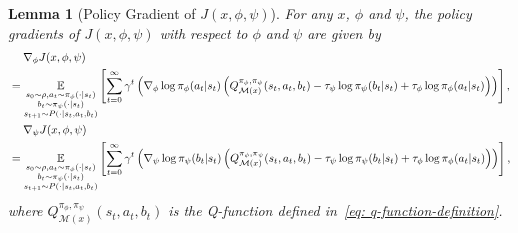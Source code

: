 \documentclass{article}
\theoremstyle{plain}
\newtheorem{lemma}{Lemma}
\theoremstyle{definition}
\theoremstyle{remark}
\def\E{\mathbb E}
\def\cM{\mathcal M}
\begin{document}
\begin{lemma}[Policy Gradient of $J(x,\phi,\psi)$]
    \label{lemma: policy-gradient-J}
    For any $x$, $\phi$ and $\psi$, the policy gradients of $J(x,\phi,\psi)$ with respect to $\phi$ and $\psi$ are given by
    \begin{align}
        &\quad\; \nabla_\phi J(x,\phi,\psi) \notag \\
        & = \underset{\substack{s_0 \sim \rho, a_t \sim \pi_\phi(\cdot|s_t) \\ b_t \sim \pi_\psi(\cdot|s_t) \\s_{t+1} \sim P(\cdot|s_t,a_t,b_t)}}{\E} \left[\sum_{t=0}^{\infty} \gamma^t \left( \nabla_\phi \log \pi_\phi(a_t|s_t) \left(   Q^{\pi_\phi,\pi_\psi}_{\cM(x)}(s_t,a_t,b_t)- \tau_\psi \log \pi_\psi(b_t|s_t) + \tau_\phi \log \pi_\phi(a_t|s_t)\right) \right) \right] ,\notag\\
        &\quad\; \nabla_\psi J(x,\phi,\psi) \notag \\
        & = \underset{\substack{s_0 \sim \rho, a_t \sim \pi_\phi(\cdot|s_t) \\ b_t \sim \pi_\psi(\cdot|s_t) \\s_{t+1} \sim P(\cdot|s_t,a_t,b_t)}}{\E} \left[\sum_{t=0}^{\infty} \gamma^t \left( \nabla_\psi \log \pi_\psi(b_t|s_t) \left(   Q^{\pi_\phi,\pi_\psi}_{\cM(x)}(s_t,a_t,b_t)- \tau_\psi \log \pi_\psi(b_t|s_t) + \tau_\phi \log \pi_\phi(a_t|s_t)\right) \right) \right],\notag
    \end{align}
    where $Q^{\pi_\phi,\pi_\psi}_{\cM(x)}(s_t,a_t,b_t)$ is the Q-function defined in~\eqref{eq: q-function-definition}.
\end{lemma}
\end{document}
